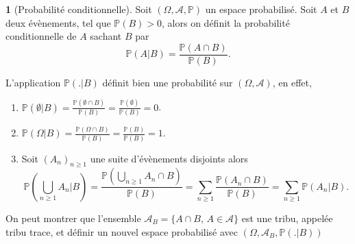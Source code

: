 \documentclass[8pt,notheorems]{beamer}
\def \P {\mathbb P}
\theoremstyle{definition}
\newtheorem{definition}{\translate{Definition}}
\theoremstyle{example}
\theoremstyle{mystyle}
\theoremstyle{plain}
\begin{document}
\begin{frame}[allowframebreaks]
\begin{definition}[Probabilité conditionnelle]
Soit $(\Omega, \mathcal{A},\mathbb{P})$ un espace probabilisé. Soit $A$ et $B$ deux évènements, tel que $\P(B)>0$, alors on définit la probabilité conditionnelle de $A$ sachant $B$ par 
$$
\P(A|B) = \frac{\P(A\cap B)}{\P(B)}. 
$$
\end{definition}
L'application $\P(.|B)$ définit bien une probabilité sur $(\Omega, \mathcal{A})$, en effet,
\begin{enumerate}
    \item $\P(\emptyset|B) = \frac{\P(\emptyset\cap B)}{\P(B)} = \frac{\P(\emptyset)}{\P(B)} = 0$. 
    \item $\P(\Omega|B) = \frac{\P(\Omega\cap B)}{\P(B)} = \frac{\P(B)}{\P(B)} = 1$.
    \item Soit $(A_n)_{n\geq 1}$ une suite d'évènements disjoints alors 
    $$
    \P\left(\bigcup_{n\geq 1}A_n|B\right) = \frac{\P\left(\bigcup_{n\geq 1}A_n\cap B\right)}{\P(B)} = \sum_{n\geq 1}\frac{\P(A_n\cap B)}{\P(B)} =  \sum_{n\geq 1}\P(A_n| B). 
    $$
\end{enumerate}
On peut montrer que l'ensemble $\mathcal{A}_B = \{A\cap B\text{, }A\in\mathcal{A}\}$ est une tribu, appelée tribu trace, et définir un nouvel espace probabilisé avec $(\Omega, \mathcal{A}_B, \P(.|B))$ 
\end{frame}
\end{document}
